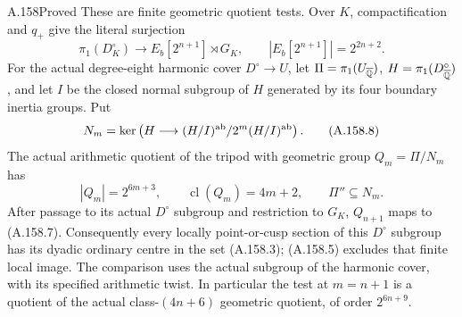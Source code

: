 \begin{statement}{A.158}{Proved}
These are finite geometric quotient tests.
Over \(K\), compactification and \(q_+\) give the literal
surjection
\[
 \pi_1(D^\circ_K)\longrightarrow
              E_b[2^{n+1}]\rtimes G_K,
 \qquad |E_b[2^{n+1}]|=2^{2n+2}.
\tag{A.158.7}
\]
For the actual degree-eight harmonic cover \(D^\circ\to U\),
let \(\Pi=\pi_1(U_{\overline{\mathbb Q}})\),
\(H=\pi_1(D^\circ_{\overline{\mathbb Q}})\), and let \(I\) be the
closed normal subgroup of \(H\) generated by its four
boundary inertia groups.  Put
\[
 N_m=\ker\left(H\longrightarrow
              (H/I)^{\rm ab}/2^m(H/I)^{\rm ab}\right).
\tag{A.158.8}
\]
The actual arithmetic quotient of the tripod with geometric
group \(Q_m=\Pi/N_m\) has
\[
 |Q_m|=2^{6m+3},\qquad
 \operatorname{cl}(Q_m)=4m+2,\qquad \Pi''\subseteq N_m.
\tag{A.158.9}
\]
After passage to its actual \(D^\circ\) subgroup and restriction
to \(G_K\), \(Q_{n+1}\) maps to (A.158.7).
Consequently every locally point-or-cusp section of this
\(D^\circ\) subgroup has its dyadic ordinary centre in the
set (A.158.3); (A.158.5) excludes that finite local image.
The comparison uses the actual subgroup of the harmonic
cover, with its specified arithmetic twist.
In particular the test at \(m=n+1\) is a quotient of the
actual class-\((4n+6)\) geometric quotient, of order
\(2^{6n+9}\).
\end{statement}

